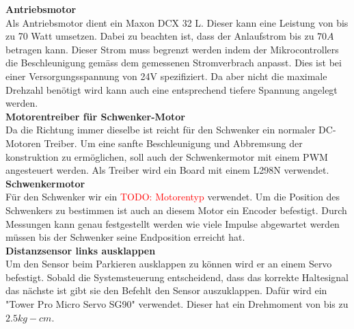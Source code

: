 \documentclass[../../main.tex]{subfiles}
\begin{document}
    \textbf{Antriebsmotor}\\
    Als Antriebsmotor dient ein Maxon DCX 32 L. Dieser kann eine Leistung von bis zu 70 Watt umsetzen. Dabei zu beachten ist, dass der Anlaufstrom bis zu $70A$ betragen kann. Dieser Strom muss begrenzt werden indem der Mikrocontrollers die Beschleunigung gemäss dem gemessenen Stromverbrach anpasst.\cite{MaxonDCX32L} Dies ist bei einer Versorgungsspannung von 24V spezifiziert. Da aber nicht die maximale Drehzahl benötigt wird kann auch eine entsprechend tiefere Spannung angelegt werden.\\ 

    \textbf{Motorentreiber für Schwenker-Motor}\\
    Da die Richtung immer dieselbe ist reicht für den Schwenker ein normaler DC-Motoren Treiber. Um eine sanfte Beschleunigung und Abbremsung der konstruktion zu ermöglichen, soll auch der Schwenkermotor mit einem PWM angesteuert werden. Als Treiber wird ein Board mit einem L298N verwendet.\\

    \textbf{Schwenkermotor}\\
    Für den Schwenker wir ein \textcolor{red}{TODO: Motorentyp} verwendet. Um die Position des Schwenkers zu bestimmen ist auch an diesem Motor ein Encoder befestigt. Durch Messungen kann genau festgestellt werden wie viele Impulse abgewartet werden müssen bis der Schwenker seine Endposition erreicht hat.\\

    \textbf{Distanzsensor links ausklappen}\\
    Um den Sensor beim Parkieren ausklappen zu können wird er an einem Servo befestigt. Sobald die Systemsteuerung entscheidend, dass das korrekte Haltesignal das nächste ist gibt sie den Befehlt den Sensor auszuklappen. Dafür wird ein "Tower Pro Micro Servo SG90" verwendet. Dieser hat ein Drehmoment von bis zu $2.5 kg-cm$. \cite{SG90Datasheet}\\

    
\end{document}
